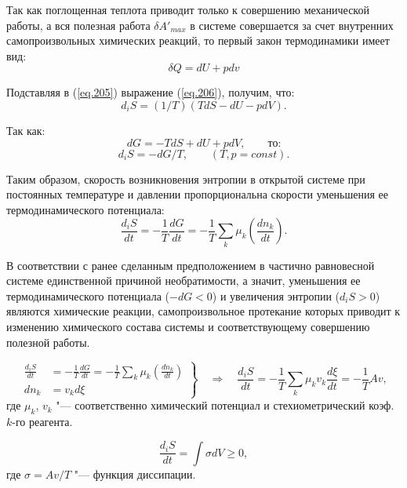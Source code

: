 \documentclass[12pt,a4paper,oneside]{book}
\begin{document}
Так как поглощенная теплота приводит только к совершению механической работы, а вся полезная работа $\delta A'_{max}$ в системе совершается за счет внутренних самопроизвольных химических реакций, то первый закон термодинамики имеет вид:
\begin{equation}
	\label{eq.206}
	\delta Q = dU + pdv
\end{equation}

Подставляя в (\ref{eq.205}) выражение (\ref{eq.206}), получим, что:
\begin{equation}
	\label{eq.207}
	d_i S = (1/T) (TdS - dU - pdV).
\end{equation}

Так как:
\begin{equation}
	\label{eq.208}
	dG = -TdS + dU + pdV, \qquad \text{то:}
\end{equation}
\begin{equation}
	d_i S = - dG / T, \qquad (T, p = const).
\end{equation}

Таким образом, скорость возникновения энтропии в открытой системе при постоянных температуре и давлении пропорциональна скорости уменьшения ее термодинамического потенциала:
\begin{equation}
	\frac{d_i S}{dt} = - \frac 1 T \frac{dG}{dt} =
		- \frac 1 T \sum_k \mu _k \left( \frac{dn_k}{dt} \right).
\end{equation}

В соответствии с ранее сделанным предположением в частично равновесной системе единственной причиной необратимости, а значит, уменьшения ее термодинамического потенциала ($-dG < 0$) и увеличения энтропии ($d_iS > 0$) являются химические реакции, самопроизвольное протекание которых приводит к изменению химического состава системы и соответствующему совершению полезной работы.

\begin{equation}
	\left.
	\begin{aligned}
		\frac{d_i S}{dt} & = - \frac 1 T \frac{dG}{dt} = - \frac 1 T \sum_k \mu _k \left( \frac{dn_k}{dt} \right)\\
		d n_k & = v_k d \xi
	\end{aligned}\right\rbrace
	\quad \Rightarrow \quad
	\frac{d_i S}{dt} = - \frac{1}{T} \sum_k \mu_k v_k \frac{d \xi}{dt} = - \frac{1}{T} A v,
\end{equation}
где $\mu_k$, $v_k$ "--- соответственно химический потенциал и стехиометрический коэф. $k$-го реагента.

\begin{equation}
	\frac{d_i S}{dt} = \int \sigma dV \ge 0,
\end{equation}
где $\sigma = A v/ T$ "--- функция диссипации.
\end{document}
